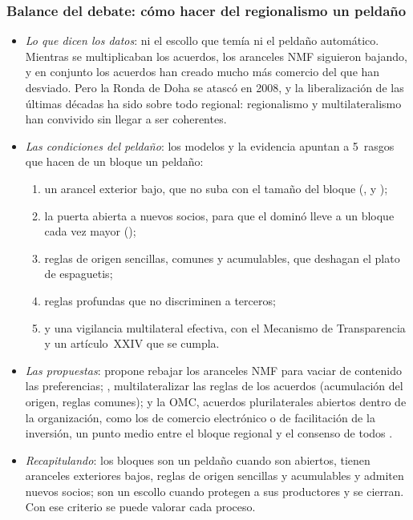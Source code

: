 \documentclass[11pt]{article}
\begin{document}
\subsubsection{Balance del debate:\cortetitulo{} cómo hacer del regionalismo un peldaño}\label{sec:balance-debate}

\begin{itemize}
\item \emph{Lo que dicen los datos}: ni el escollo que temía  ni el peldaño automático. Mientras se multiplicaban los acuerdos, los aranceles NMF siguieron bajando, y en conjunto los acuerdos han creado mucho más comercio del que han desviado\nocite{FreundOrnelas2010}. Pero la Ronda de Doha se atascó en 2008, y la liberalización de las últimas décadas ha sido sobre todo regional: regionalismo y multilateralismo han convivido sin llegar a ser coherentes\nocite{OMC2011InformeACR}.
\item \emph{Las condiciones del peldaño}: los modelos y la evidencia apuntan a 5~rasgos que hacen de un bloque un peldaño:
  \begin{enumerate}
  \item un arancel exterior bajo, que no suba con el tamaño del bloque (,  y );
  \item la puerta abierta a nuevos socios, para que el dominó lleve a un bloque cada vez mayor ();
  \item reglas de origen sencillas, comunes y acumulables, que deshagan el plato de espaguetis;
  \item reglas profundas que no discriminen a terceros;
  \item y una vigilancia multilateral efectiva, con el Mecanismo de Transparencia y un artículo~XXIV que se cumpla.
  \end{enumerate}
\item \emph{Las propuestas}:  propone rebajar los aranceles NMF para vaciar de contenido las preferencias; , multilateralizar las reglas de los acuerdos (acumulación del origen, reglas comunes); y la OMC, acuerdos plurilaterales abiertos dentro de la organización, como los de comercio electrónico o de facilitación de la inversión, un punto medio entre el bloque regional y el consenso de todos\nocite{OMC2011InformeACR} .
\item \emph{Recapitulando}: los bloques son un peldaño cuando son abiertos, tienen aranceles exteriores bajos, reglas de origen sencillas y acumulables y admiten nuevos socios; son un escollo cuando protegen a sus productores y se cierran. Con ese criterio se puede valorar cada proceso.
\end{itemize}
\end{document}
